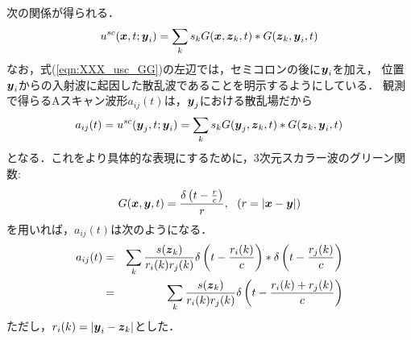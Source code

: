 次の関係が得られる．
\begin{equation}
	u^{sc}(\mbox{\boldmath $x$},t;\mbox{\boldmath $y$}_{i})=\sum_k s_k G(\mbox{\boldmath $x$},\mbox{\boldmath $z$}_k,t)*G(\mbox{\boldmath $z$}_k,\mbox{\boldmath $y$}_i,t)
	\label{eqn:XXX_usc_GG}
\end{equation}
なお，式(\ref{eqn:XXX_usc_GG})の左辺では，セミコロンの後に$\mbox{\boldmath $y$}_i$を加え，
位置$\mbox{\boldmath $y$}_i$からの入射波に起因した散乱波であることを明示するようにしている．
観測で得らるAスキャン波形$a_{ij}(t)$は，$\mbox{\boldmath $y$}_j$における散乱場だから
\begin{equation}
	a_{ij}(t)
	=u^{sc}(\mbox{\boldmath $y$}_j,t;\mbox{\boldmath $y$}_i)
	=\sum_k s_k G(\mbox{\boldmath $y$}_j,\mbox{\boldmath $z$}_k,t)*G(\mbox{\boldmath $z$}_k,\mbox{\boldmath $y$}_i,t)
	\label{eqn:XXX_aij_GG}
\end{equation}
となる．これをより具体的な表現にするために，3次元スカラー波のグリーン関数:
\begin{equation}
	G(\mbox{\boldmath $x$},\mbox{\boldmath $y$},t)=
	\frac{\delta\left(t-\frac{r}{c}\right)}{r}, 
	\ \ (r=\left| \mbox{\boldmath $x$}-\mbox{\boldmath $y$}\right|)
	\label{eqn:}
\end{equation}
を用いれば，$a_{ij}(t)$は次のようになる．
\begin{eqnarray}
	a_{ij}(t)
	&=&
	\sum_{k}
	\frac{ s(\mbox{\boldmath $z$}_k) }{ r_i(k)r_j(k) }
	\delta\left(t-\frac{r_i(k)}{c}\right) * \delta\left( t-\frac{r_j(k)}{c}\right)\\
	\label{eqn:}
	&=&
	\sum_k
	\frac{ s(\mbox{\boldmath $z$}_k) }{ r_i(k)r_j(k) }
	\delta\left(t-\frac{r_i(k)+r_j(k)}{c}\right) 
	\label{eqn:XXX_aijt}
\end{eqnarray}
ただし，$r_i(k)=\left| \mbox{\boldmath $y$}_i-\mbox{\boldmath $z$}_k\right|$とした．

